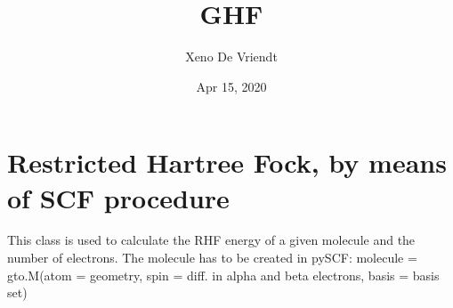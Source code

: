 \documentclass[letterpaper,10pt,english]{sphinxmanual}
\title{GHF}
\date{Apr 15, 2020}
\author{Xeno De Vriendt}
\begin{document}
\pagestyle{empty}
\sphinxmaketitle
\pagestyle{plain}
\sphinxtableofcontents
\pagestyle{normal}
\label{\detokenize{index::doc}}

\label{\detokenize{RHF:module-hf.RHF}}

\chapter{Restricted Hartree Fock, by means of SCF procedure}
\label{\detokenize{RHF:restricted-hartree-fock-by-means-of-scf-procedure}}\label{\detokenize{RHF::doc}}
This class is used to calculate the RHF energy of a given molecule and the number of electrons.
The molecule has to be created in pySCF:
molecule = gto.M(atom = geometry, spin = diff. in alpha and beta electrons, basis = basis set)
\end{document}

